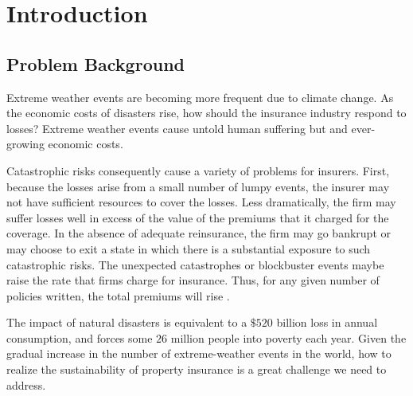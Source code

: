 \documentclass{mcmthesis}
\begin{document}
\begin{abstract}
Finally, we analyze the sensitivity and robustness of our models, the models can change
the insurance rate sensitively according to the change of the market predicted return and the
slight error of the risk factor calculation will not affect the models’ result, which verifies the
sensitivity and robustness of our models. In addition we analyze the strengths and weaknesses
of the models.

\begin{keywords}
Risk Analysis, Risk-Capital Asset Pricing Model, Sperman-CRITIC, AHP,
Building Preservation Model
\end{keywords}

\end{abstract}
\maketitle

\tableofcontents

\newpage

\section{Introduction}
\subsection{Problem Background}

Extreme weather events are becoming more frequent due to climate change. As the economic
costs of disasters rise, how should the insurance industry respond to losses? Extreme
weather events cause untold human suffering but and ever-growing economic costs.

Catastrophic risks consequently cause a variety of problems for insurers. First, because
the losses arise from a small number of lumpy events, the insurer may not have sufficient resources
to cover the losses. Less dramatically, the firm may suffer losses well in excess of the
value of the premiums that it charged for the coverage. In the absence of adequate reinsurance,
the firm may go bankrupt or may choose to exit a state in which there is a substantial exposure
to such catastrophic risks. The unexpected catastrophes or blockbuster events maybe raise the
rate that firms charge for insurance. Thus, for any given number of policies written, the total
premiums will rise \cite{born2006}.

The impact of natural disasters is equivalent to a $\$520$ billion loss in annual consumption,
and forces some $26$ million people into poverty each year. Given the gradual increase in the
number of extreme-weather events in the world, how to realize the sustainability of property
insurance is a great challenge we need to address.
\end{document}
